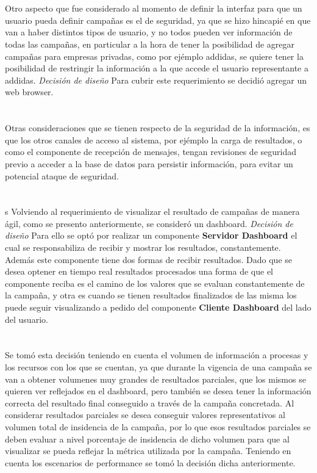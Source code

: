 \documentclass[a4paper, 11pt]{article}
\begin{document}
\\
\\
Otro aspecto que fue considerado al momento de definir la interfaz para que un usuario pueda definir campañas es el de seguridad, ya que se hizo hincapié en que van a haber distintos tipos de usuario, y no todos pueden ver información de todas las campañas, en particular a la hora de tener la posibilidad de agregar campañas para empresas privadas, como por ejémplo addidas, se quiere tener la posibilidad de restringir la información a la que accede el usuario representante a addidas.
\emph{Decisión de diseño} Para cubrir este requerimiento se decidió agregar un web browser. \\
\\
\\
Otras consideraciones que se tienen respecto de la seguridad de la información, es que los otros canales de acceso al sistema, por ejémplo la carga de resultados, o como el componente de recepción de mensajes, tengan revisiones de seguridad previo a acceder a la base de datos para persistir información, para evitar un potencial ataque de seguridad.\\
\\
\\s
Volviendo al requerimiento de visualizar el resultado de campañas de manera ágil, como se presento anteriormente, se consideró un dashboard.
\emph{Decisión de diseño} Para ello se optó por realizar un componente \textbf{Servidor Dashboard} el cual se responsabiliza de recibir y mostrar los resultados, constantemente. Además este componente tiene dos formas de recibir resultados. Dado que se desea optener en tiempo real resultados procesados una forma de que el componente reciba es el camino de los valores que se evaluan constantemente de la campaña, y otra es cuando se tienen resultados finalizados de las misma los puede seguir visualizando a pedido del componente \textbf{Cliente Dashboard} del lado del usuario.\\
\\
\\
Se tomó esta decisión teniendo en cuenta el volumen de información a procesas y los recursos con los que se cuentan, ya que durante la vigencia de una campaña se van a obtener volumenes muy grandes de resultados parciales,  que los mismos se quieren ver reflejados en el dashboard, pero también se desea tener la información correcta del resultado final conseguido a través de la campaña concretada. Al considerar resultados parciales se desea conseguir valores representativos al volumen total de insidencia de la campaña, por lo que esos resultados parciales se deben evaluar a nivel porcentaje de insidencia de dicho volumen para que al visualizar se pueda reflejar la métrica utilizada por la campaña.
Teniendo en cuenta los escenarios de performance se tomó la decisión dicha anteriormente.
\end{document}
